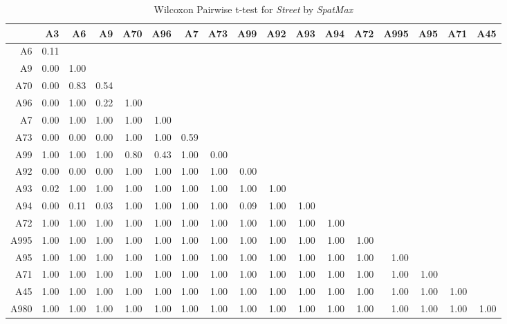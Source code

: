 \begin{table}[ht]
	\tiny
	\setlength{\tabcolsep}{4pt}
	\centering
	\begin{tabular}{rrrrrrrrrrrrrrrrr}
		\toprule
		& A3 & A6 & A9 & A70 & A96 & A7 & A73 & A99 & A92 & A93 & A94 & A72 & A995 & A95 & A71 & A45 \\ 
		\midrule
		A6 	& 0.11 &  &  &  &  &  &  &  &  &  &  &  &  &  &  &  \\ 
		A9 	& 0.00 & 1.00 &  &  &  &  &  &  &  &  &  &  &  &  &  &  \\ 
		A70 & 0.00 & 0.83 & 0.54 &  &  &  &  &  &  &  &  &  &  &  &  &  \\ 
		A96 & 0.00 & 1.00 & 0.22 & 1.00 &  &  &  &  &  &  &  &  &  &  &  &  \\ 
		A7 	& 0.00 & 1.00 & 1.00 & 1.00 & 1.00 &  &  &  &  &  &  &  &  &  &  &  \\ 
		A73 & 0.00 & 0.00 & 0.00 & 1.00 & 1.00 & 0.59 &  &  &  &  &  &  &  &  &  &  \\ 
		A99 & 1.00 & 1.00 & 1.00 & 0.80 & 0.43 & 1.00 & 0.00 &  &  &  &  &  &  &  &  &  \\ 
		A92 & 0.00 & 0.00 & 0.00 & 1.00 & 1.00 & 1.00 & 1.00 & 0.00 &  &  &  &  &  &  &  &  \\ 
		A93 & 0.02 & 1.00 & 1.00 & 1.00 & 1.00 & 1.00 & 1.00 & 1.00 & 1.00 &  &  &  &  &  &  &  \\ 
		A94 & 0.00 & 0.11 & 0.03 & 1.00 & 1.00 & 1.00 & 1.00 & 0.09 & 1.00 & 1.00 &  &  &  &  &  &  \\ 
		A72 & 1.00 & 1.00 & 1.00 & 1.00 & 1.00 & 1.00 & 1.00 & 1.00 & 1.00 & 1.00 & 1.00 &  &  &  &  &  \\ 
		A995 & 1.00 & 1.00 & 1.00 & 1.00 & 1.00 & 1.00 & 1.00 & 1.00 & 1.00 & 1.00 & 1.00 & 1.00 &  &  &  &  \\ 
		A95 & 1.00 & 1.00 & 1.00 & 1.00 & 1.00 & 1.00 & 1.00 & 1.00 & 1.00 & 1.00 & 1.00 & 1.00 & 1.00 &  &  &  \\ 
		A71 & 1.00 & 1.00 & 1.00 & 1.00 & 1.00 & 1.00 & 1.00 & 1.00 & 1.00 & 1.00 & 1.00 & 1.00 & 1.00 & 1.00 &  &  \\ 
		A45 & 1.00 & 1.00 & 1.00 & 1.00 & 1.00 & 1.00 & 1.00 & 1.00 & 1.00 & 1.00 & 1.00 & 1.00 & 1.00 & 1.00 & 1.00 &  \\ 
		A980 & 1.00 & 1.00 & 1.00 & 1.00 & 1.00 & 1.00 & 1.00 & 1.00 & 1.00 & 1.00 & 1.00 & 1.00 & 1.00 & 1.00 & 1.00 & 1.00 \\ 
		\bottomrule
	\end{tabular}
	\caption{Wilcoxon Pairwise t-test for \textit{Street} by \textit{SpatMax}}
\end{table}

